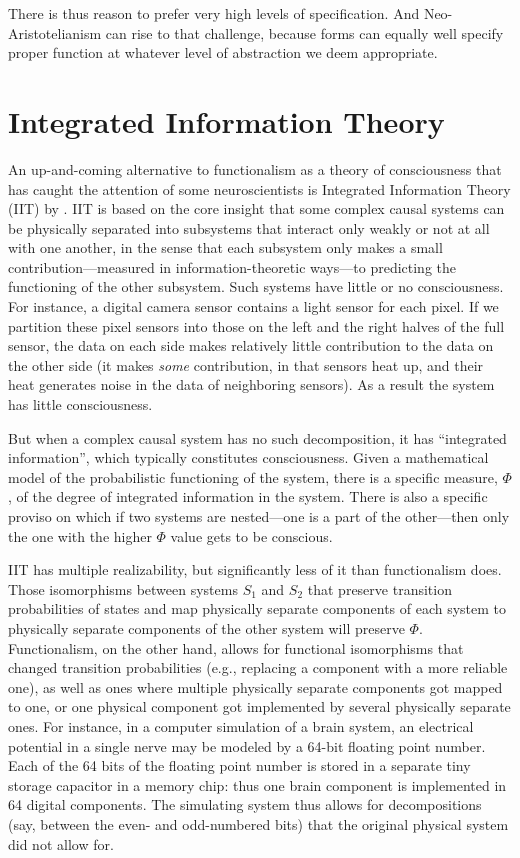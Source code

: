 There is thus reason to prefer very high levels of specification. And Neo-Aristotelianism can rise to that challenge, because 
forms can equally well specify proper function at whatever level of abstraction we deem appropriate. 

\section{Integrated Information Theory}
An up-and-coming alternative to functionalism as a theory of consciousness that has caught the attention of some 
neuroscientists is Integrated Information Theory (IIT) by . IIT is based on the core insight that some complex causal systems 
can be physically separated into subsystems that interact only weakly or not at all with one another, in the sense that each 
subsystem only makes a small contribution---measured in information-theoretic ways---to predicting the functioning 
of the other subsystem. Such systems have little or no consciousness. For instance, a digital camera sensor contains a 
light sensor for each pixel. If we partition these pixel sensors into those on the left and the right halves of the 
full sensor, the data on each side makes relatively little contribution to the data on the other side (it makes \textit{some}
contribution, in that sensors heat up, and their heat generates noise in the data of neighboring
sensors). As a result the system has little consciousness.

But when a complex causal system has no such decomposition, it has ``integrated information'',
which typically constitutes consciousness. Given a mathematical model of the probabilistic functioning of the system, 
there is a specific measure, $\Phi$, of the degree of integrated information in the system. There is also a specific
proviso on which if two systems are nested---one is a part of the other---then only the one with the higher $\Phi$
value gets to be conscious. 

IIT has multiple realizability, but significantly less of it than functionalism does. Those isomorphisms 
between systems $S_1$ and $S_2$ that preserve transition probabilities of states and map physically separate 
components of each system to physically separate components of the other system will preserve $\Phi$. 
Functionalism, on the other hand, allows for functional isomorphisms that changed transition probabilities 
(e.g., replacing a component with a more reliable one), as well as ones where multiple physically separate 
components got mapped to one, or one physical component got implemented by several physically separate ones. 
For instance, in a computer simulation of a brain system, an electrical potential in a single nerve may be 
modeled by a 64-bit floating point number. Each of the 64 bits of the floating point number is stored in a
separate tiny storage capacitor in a memory chip: thus one brain component is implemented in 64 digital components.
The simulating system thus allows for decompositions (say, between the even- and odd-numbered bits) that the original
physical system did not allow for. 

